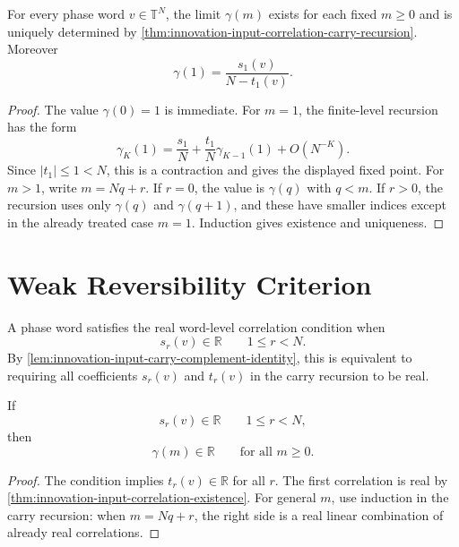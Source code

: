 \begin{theorem}
\label{thm:innovation-input-correlation-existence}
For every phase word $v\in\mathbb T^N$, the limit $\gamma(m)$ exists for
each fixed $m\ge0$ and is uniquely determined by
\autoref{thm:innovation-input-correlation-carry-recursion}. Moreover
$$
\gamma(1)=\frac{s_1(v)}{N-t_1(v)}.
$$
\end{theorem}

\begin{proof}
The value $\gamma(0)=1$ is immediate. For $m=1$, the finite-level recursion
has the form
$$
\gamma_K(1)
=
\frac{s_1}{N}
+
\frac{t_1}{N}\gamma_{K-1}(1)
+
O(N^{-K}).
$$
Since $|t_1|\le1<N$, this is a contraction and gives the displayed fixed
point. For $m>1$, write $m=Nq+r$. If $r=0$, the value is $\gamma(q)$ with
$q<m$. If $r>0$, the recursion uses only $\gamma(q)$ and $\gamma(q+1)$,
and these have smaller indices except in the already treated case
$m=1$. Induction gives existence and uniqueness.
\end{proof}

\section{Weak Reversibility Criterion}
\label{sec:innovation-input-correlation-weak-reversibility}

\begin{definition}
\label{def:innovation-input-real-word-level-correlation-condition}
A phase word satisfies the real word-level correlation condition when
$$
s_r(v)\in\mathbb R
\qquad
1\le r<N.
$$
By \autoref{lem:innovation-input-carry-complement-identity}, this is
equivalent to requiring all coefficients $s_r(v)$ and $t_r(v)$ in the
carry recursion to be real.
\end{definition}

\begin{theorem}
\label{thm:innovation-input-real-word-level-criterion}
If
$$
s_r(v)\in\mathbb R
\qquad
1\le r<N,
$$
then
$$
\gamma(m)\in\mathbb R
\qquad
\text{for all }m\ge0.
$$
\end{theorem}

\begin{proof}
The condition implies $t_r(v)\in\mathbb R$ for all $r$. The first
correlation is real by
\autoref{thm:innovation-input-correlation-existence}. For general $m$,
use induction in the carry recursion: when $m=Nq+r$, the right side is a
real linear combination of already real correlations.
\end{proof}

